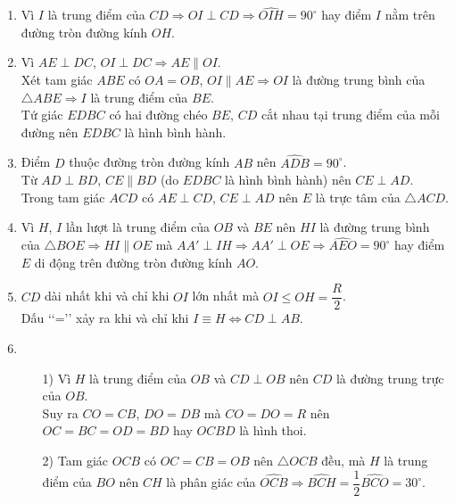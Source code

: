 \begin{bt}
{\begin{center}
		\end{center}
		\begin{enumerate}
			\item Vì $I$ là trung điểm của $CD\Rightarrow OI\perp CD\Rightarrow \widehat{OIH}=90^\circ$ hay điểm $I$ nằm trên đường tròn đường kính $OH$.
			\item Vì $AE\perp DC$, $OI\perp DC\Rightarrow AE\parallel OI$.\\
			Xét tam giác $ABE$ có $OA=OB$, $OI\parallel AE\Rightarrow OI$ là đường trung bình của $\triangle ABE\Rightarrow I$ là trung điểm của $BE$.\\
			Tứ giác $EDBC$ có hai đường chéo $BE$, $CD$ cắt nhau tại trung điểm của mỗi đường nên $EDBC$ là hình bình hành.
			\item Điểm $D$ thuộc đường tròn đường kính $AB$ nên $\widehat{ADB}=90^\circ$.\\
			Từ $AD\perp BD$, $CE\parallel BD$ (do $EDBC$ là hình bình hành) nên $CE\perp AD$.\\
			Trong tam giác $ACD$ có $AE\perp CD$, $CE\perp AD$ nên $E$ là trực tâm của $\triangle ACD$.
			\item Vì $H$, $I$ lần lượt là trung điểm của $OB$ và $BE$ nên $HI$ là đường trung bình của $\triangle BOE\Rightarrow HI\parallel OE$ mà $AA'\perp IH\Rightarrow AA'\perp OE\Rightarrow \widehat{AEO}=90^\circ$ hay điểm $E$ di động trên đường tròn đường kính $AO$.
			\item $CD$ dài nhất khi và chỉ khi $OI$ lớn nhất mà $OI\le OH=\dfrac{R}{2}$.\\
			Dấu \lq\lq=\rq\rq\text{} xảy ra khi và chỉ khi $I\equiv H\Leftrightarrow CD\perp AB$.
			\item 
			\begin{itemize}
				\item[1)] Vì $H$ là trung điểm của $OB$ và $CD\perp OB$ nên $CD$ là đường trung trực của $OB$.\\
				Suy ra $CO=CB$, $DO=DB$ mà $CO=DO=R$ nên $OC=BC=OD=BD$ hay $OCBD$ là hình thoi.
				\item[2)] Tam giác $OCB$ có $OC=CB=OB$ nên $\triangle OCB$ đều, mà $H$ là trung điểm của $BO$ nên $CH$ là phân giác của $\widehat{OCB}\Rightarrow \widehat{BCH}=\dfrac{1}{2}\widehat{BCO}=30^\circ$.\\

\end{itemize}
\end{enumerate}}
\end{bt}
